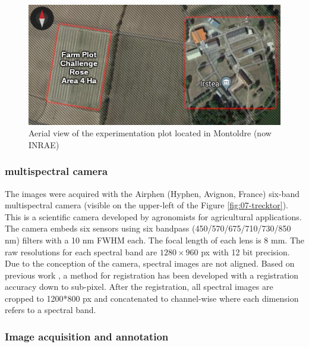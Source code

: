 \documentclass[../thesis.tex]{subfiles}
\begin{document}
    \begin{figure}[H]
        \centering
        \includegraphics[width=0.5\linewidth]{img/leaf/parcelle-xp}
        \caption{Aerial view of the experimentation plot located in Montoldre (now INRAE)}
        \label{fig:07-parcelle-xp}
    \end{figure}
    
    \subsubsection{multispectral camera}
    
    The images were acquired with the Airphen (Hyphen, Avignon, France) six-band multispectral camera (visible on the upper-left of the Figure \ref{fig:07-trecktor}). This is a scientific camera developed by agronomists for agricultural applications. The camera embeds six sensors using six bandpass (450/570/675/710/730/850 nm) filters with a 10 nm FWHM each. The focal length of each lens is 8 mm. The raw resolutions for each spectral band are $1280 \times 960$ px with 12 bit precision. Due to the conception of the camera, spectral images are not aligned. Based on previous work \cite{vayssade:hal-02499730}, a method for registration has been developed with a registration accuracy down to sub-pixel. After the registration, all spectral images are cropped to 1200*800 px and concatenated to channel-wise where each dimension refers to a spectral band.
    
    
    
    \subsubsection{Image acquisition and annotation}
    
\end{document}
